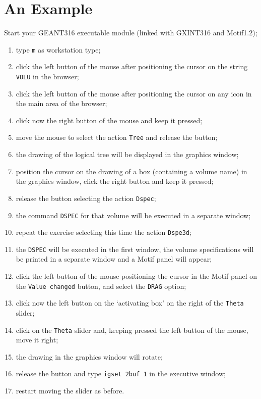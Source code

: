 \section{An Example}

Start your GEANT316 executable module (linked with GXINT316 and Motif1.2);
\begin{enumerate}
\item type {\tt m} as workstation type;
\item click the left button of the mouse after positioning the cursor on the 
string {\tt VOLU} in the browser;
\item click the left button of the mouse after positioning the cursor on 
any icon in the main area of the browser;
\item click now the right button of the mouse and keep it pressed;
\item move the mouse to select the action {\tt Tree} and release the button;
\item the drawing of the logical tree will be displayed in the graphics
window;
\item position the cursor on the drawing of a box (containing a volume name)
in the graphics window, click the right button and keep it pressed;
\item release the button selecting the action {\tt Dspec};
\item the command {\tt DSPEC} for that volume will be executed in a separate
window;
\item repeat the exercise selecting this time the action {\tt Dspe3d};
\item the {\tt DSPEC} will be executed in the first window, the volume 
specifications will be printed in a separate window and a Motif panel will
appear;
\item click the left button of the mouse positioning the cursor in the Motif
panel on the {\tt Value changed} button, and select the {\tt DRAG} option;
\item click now the left button on the `activating box' on the right of
the {\tt Theta} slider;
\item click on the {\tt Theta} slider and, keeping pressed the 
left button of the mouse, move it right;
\item the drawing in the graphics window will rotate;
\item release the button and type {\tt igset 2buf 1} in the executive window;
\item restart moving the slider as before. 
\end{enumerate}
